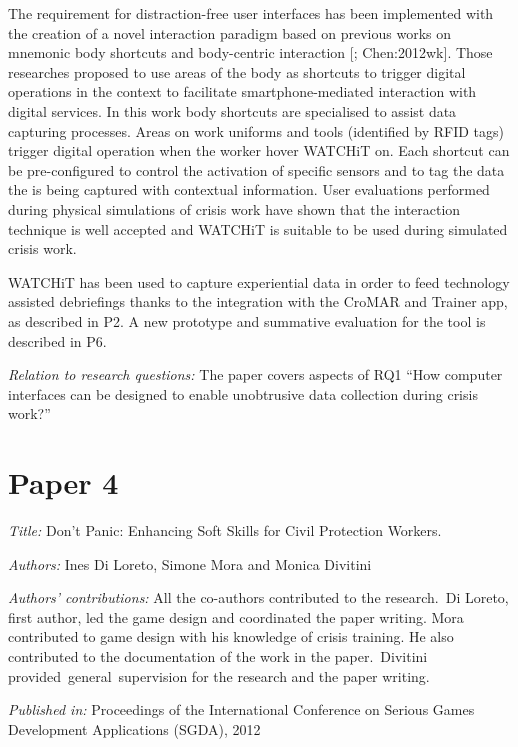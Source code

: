 The requirement for distraction-free user interfaces has been
implemented with the creation of a novel interaction paradigm based on
previous works on mnemonic body shortcuts and body-centric interaction
{[}\textcite{Guerreiro:2008wt}; Chen:2012wk{]}. Those researches
proposed to use areas of the body as shortcuts to trigger digital
operations in the context to facilitate smartphone-mediated interaction
with digital services. In this work body shortcuts are specialised to
assist data capturing processes. Areas on work uniforms and tools
(identified by RFID tags) trigger digital operation when the worker
hover WATCHiT on. Each shortcut can be pre-configured to control the
activation of specific sensors and to tag the data the is being captured
with contextual information. User evaluations performed during physical
simulations of crisis work have shown that the interaction technique is
well accepted and WATCHiT is suitable to be used during simulated crisis
work.

WATCHiT has been used to capture experiential data in order to feed
technology assisted debriefings thanks to the integration with the
CroMAR and Trainer app, as described in P2. A new prototype and
summative evaluation for the tool is described in P6.

\emph{Relation to research questions:} The paper covers aspects of RQ1
``How computer interfaces can be designed to enable unobtrusive data
collection during crisis work?''

\section{Paper 4}\label{paper-4}

\emph{Title:} Don't Panic: Enhancing Soft Skills for Civil Protection
Workers.

\emph{Authors:} Ines Di Loreto, Simone Mora and Monica Divitini

\emph{Authors' contributions:} All the co-authors contributed to the
research.~Di Loreto, first author, led the game design and coordinated
the paper writing. Mora contributed to game design with his knowledge of
crisis training. He also contributed to the documentation of the work in
the paper.~Divitini provided~general~supervision for the research and
the paper writing.

\emph{Published in:} Proceedings of the International Conference on
Serious Games Development Applications (SGDA), 2012

